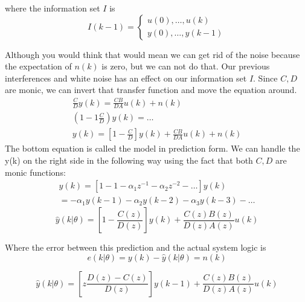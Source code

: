 \documentclass[11pt]{article}
\begin{document}
where the information set $I$ is 
\begin{equation}
    I(k-1) = 
    \begin{cases}
       u(0), \dots, u(k) \\
       y(0), \dots, y(k-1)
    \end{cases}
\end{equation}

Although you would think that would mean we can get rid of the noise because the expectation of $n(k)$ is zero, but we can not do that.
Our previous interferences and white noise has an effect on our information set $I$.
Since $C,D$ are monic, we can invert that transfer function and move the equation around.
\begin{gather}
    \frac{C}{D}y(k) = \frac{C B}{D A} u(k) + n(k)\\
    (1-1 \frac{C}{D}) y(k) = \dots \\
    y(k) = [1-\frac{C}{D}]y(k) + \frac{C B}{D A} u(k) + n(k)
\end{gather}
The bottom equation is called the model in prediction form.
We can handle the y(k) on the right side in the following way using the fact that both $C,D$ are monic functions:
\begin{gather}
    [1-\frac{C}{D}]y(k) = [1-1 - \alpha_1 z^{-1} - \alpha_2 z^{-2} - \dots] y(k) \\
    = -\alpha_1 y(k-1) - \alpha_2 y(k-2) - \alpha_3 y(k-3) - \dots
\end{gather}
\begin{equation}
    \hat{y}(k|\theta) = [1- \frac{C(z)}{D(z)}]y(k) + \frac{C(z) B(z)}{D(z) A(z)} u(k)
\end{equation}

Where the error between this prediction and the actual system logic is
\begin{equation}
    e(k|\theta) = y(k) - \hat{y}(k|\theta) = n(k)
\end{equation}

\begin{equation}
    \hat{y} (k | \theta) = [z \frac{D(z) - C(z)}{D(z)}] y(k-1) + \frac{C(z) B(z)}{D(z) A(z)} u(k)
\end{equation}





\end{document}
